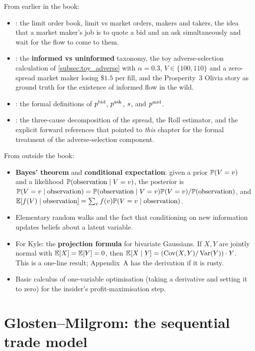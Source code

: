 \begin{backgroundbox}[Prerequisites]
From earlier in the book:
\begin{itemize}
  \item {}: the limit order book, limit vs market orders,
  makers and takers, the idea that a market maker's job is to
  quote a bid and an ask simultaneously and wait for the flow to
  come to them.
  \item {}: the \textbf{informed vs uninformed}
  taxonomy, the toy adverse-selection calculation of
  \cref{subsec:toy_adverse} with $\alpha = 0.3$, $V \in \{100, 110\}$
  and a zero-spread market maker losing $\$1.5$ per fill, and the
  Prosperity~3 Olivia story as ground truth for the existence of
  informed flow in the wild.
  \item {}: the formal definitions of $p^{\mathrm{bid}}$,
  $p^{\mathrm{ask}}$, $s$, and $p^{\mathrm{mid}}$.
  \item {}: the three-cause decomposition of the
  spread, the Roll estimator, and the explicit forward references
  that pointed to \emph{this} chapter for the formal treatment of
  the adverse-selection component.
\end{itemize}
From outside the book:
\begin{itemize}
  \item \textbf{Bayes' theorem} and \textbf{conditional
  expectation}: given a prior $\mathbb{P}(V = v)$ and a likelihood
  $\mathbb{P}(\text{observation} \mid V = v)$, the posterior is
  $\mathbb{P}(V = v \mid \text{observation}) = \mathbb{P}(\text{observation} \mid
  V = v) \mathbb{P}(V = v) / \mathbb{P}(\text{observation})$, and
  $\mathbb{E}[f(V) \mid \text{observation}] = \sum_v f(v) \mathbb{P}(V = v \mid
  \text{observation})$.
  \item Elementary random walks and the fact that conditioning on
  new information updates beliefs about a latent variable.
  \item For Kyle: the \textbf{projection formula} for bivariate
  Gaussians. If $X, Y$ are jointly normal with $\mathbb{E}[X] = \mathbb{E}[Y] = 0$,
  then $\mathbb{E}[X \mid Y] = (\operatorname{Cov}(X, Y) / \operatorname{Var}(Y)) \cdot Y$. This is a
  one-line result; Appendix~A has the derivation if it is rusty.
  \item Basic calculus of one-variable optimisation (taking a
  derivative and setting it to zero) for the insider's
  profit-maximisation step.
\end{itemize}
\end{backgroundbox}

\section{Glosten--Milgrom: the sequential trade model}
\label{sec:gm}


